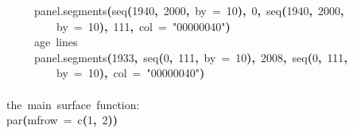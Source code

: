 \documentclass[a4paper]{article}
\newcommand{\hlnumber}[1]{\textcolor[rgb]{0.0823529411764706,0.0784313725490196,0.709803921568627}{#1}}%
\newcommand{\hlfunctioncall}[1]{\textcolor[rgb]{1,0,0}{#1}}%
\newcommand{\hlstring}[1]{\textcolor[rgb]{0.6,0.6,1}{#1}}%
\newcommand{\hlkeyword}[1]{\textcolor[rgb]{0,0,0}{\textbf{#1}}}%
\newcommand{\hlargument}[1]{\textcolor[rgb]{0.694117647058824,0.247058823529412,0.0196078431372549}{#1}}%
\newcommand{\hlcomment}[1]{\textcolor[rgb]{0.8,0.8,0.8}{#1}}%
\newcommand{\hlprompt}[1]{\textcolor[rgb]{0,0,0}{#1}}%
\newcommand{\hlstd}[1]{\textcolor[rgb]{0,0,0}{#1}}%
\newenvironment{Houtput}{\raggedright}{%
%
}
\begin{document}
\begin{Houtput}
\hlstd{}\hlprompt{{\ }}{\ }{\ }{\ }{\ }\hlfunctioncall{panel.segments}\hlkeyword{(}\hlfunctioncall{seq}\hlkeyword{(}\hlnumber{1940}\hlkeyword{,}{\ }\hlnumber{2000}\hlkeyword{,}{\ }\hlargument{by}{\ }\hlargument{=}{\ }\hlnumber{10}\hlkeyword{)}\hlkeyword{,}{\ }\hlnumber{0}\hlkeyword{,}{\ }\hlfunctioncall{seq}\hlkeyword{(}\hlnumber{1940}\hlkeyword{,}{\ }\hlnumber{2000}\hlkeyword{,}\hspace*{\fill}\\
\hlstd{}\hlprompt{{\ }}{\ }{\ }{\ }{\ }{\ }{\ }{\ }{\ }\hlargument{by}{\ }\hlargument{=}{\ }\hlnumber{10}\hlkeyword{)}\hlkeyword{,}{\ }\hlnumber{111}\hlkeyword{,}{\ }\hlargument{col}{\ }\hlargument{=}{\ }\hlstring{"\usebox{\hlnormalsizeboxhash}00000040"}\hlkeyword{)}\hspace*{\fill}\\
\hlstd{}\hlprompt{{\ }}{\ }{\ }{\ }{\ }\hlcomment{\usebox{\hlnormalsizeboxhash}{\ }age{\ }lines}\hspace*{\fill}\\
\hlstd{}\hlprompt{{\ }}{\ }{\ }{\ }{\ }\hlfunctioncall{panel.segments}\hlkeyword{(}\hlnumber{1933}\hlkeyword{,}{\ }\hlfunctioncall{seq}\hlkeyword{(}\hlnumber{0}\hlkeyword{,}{\ }\hlnumber{111}\hlkeyword{,}{\ }\hlargument{by}{\ }\hlargument{=}{\ }\hlnumber{10}\hlkeyword{)}\hlkeyword{,}{\ }\hlnumber{2008}\hlkeyword{,}{\ }\hlfunctioncall{seq}\hlkeyword{(}\hlnumber{0}\hlkeyword{,}{\ }\hlnumber{111}\hlkeyword{,}\hspace*{\fill}\\
\hlstd{}\hlprompt{{\ }}{\ }{\ }{\ }{\ }{\ }{\ }{\ }{\ }\hlargument{by}{\ }\hlargument{=}{\ }\hlnumber{10}\hlkeyword{)}\hlkeyword{,}{\ }\hlargument{col}{\ }\hlargument{=}{\ }\hlstring{"\usebox{\hlnormalsizeboxhash}00000040"}\hlkeyword{)}\hspace*{\fill}\\
\hlstd{}\hlprompt{{\ }}\hlkeyword{\usebox{\hlnormalsizeboxclosebrace}}\mbox{}
\normalfont
\hspace*{\fill}\\
\hlstd{}\ttfamily\noindent
\hlprompt{\usebox{\hlnormalsizeboxgreaterthan}{\ }}\hlcomment{\usebox{\hlnormalsizeboxhash}{\ }the{\ }main{\ }surface{\ }function:}\mbox{}
\normalfont
\hspace*{\fill}\\
\hlstd{}\ttfamily\noindent
\hlprompt{\usebox{\hlnormalsizeboxgreaterthan}{\ }}\hlfunctioncall{par}\hlkeyword{(}\hlargument{mfrow}{\ }\hlargument{=}{\ }\hlfunctioncall{c}\hlkeyword{(}\hlnumber{1}\hlkeyword{,}{\ }\hlnumber{2}\hlkeyword{)}\hlkeyword{)}\mbox{}

\end{Houtput}
\end{document}
